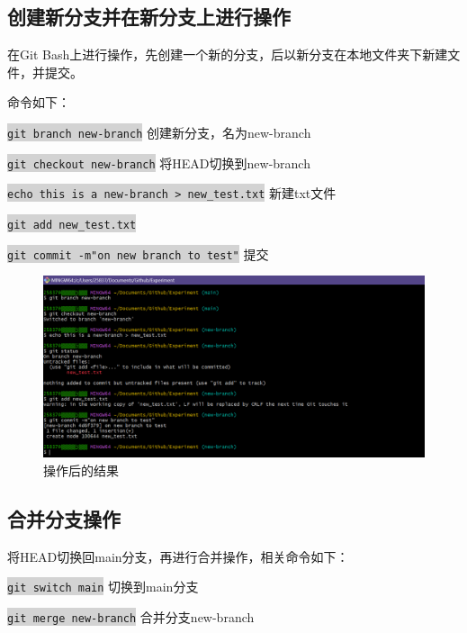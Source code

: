 \documentclass[a4paper, 12pt]{article}
\begin{document}
\clearpage  %

  \subsection{创建新分支并在新分支上进行操作}

在Git Bash上进行操作，先创建一个新的分支，后以新分支在本地文件夹下新建文件，并提交。

命令如下：

\colorbox{lightgray}{\texttt{git branch new-branch}} 创建新分支，名为new-branch

\colorbox{lightgray}{\texttt{git checkout new-branch}} 将HEAD切换到new-branch

\colorbox{lightgray}{\texttt{echo this is a new-branch \textgreater\ new\_test.txt}} 新建txt文件

\colorbox{lightgray}{\texttt{git add new\_test.txt}}

\colorbox{lightgray}{\texttt{git commit -m"on new branch to test"}} 提交

\begin{figure}[h]
  \centering
  \includegraphics[width=1\textwidth]{im8}
  \caption{操作后的结果}
  \label{image-myimage}
\end{figure}

\clearpage

  \subsection{合并分支操作}

将HEAD切换回main分支，再进行合并操作，相关命令如下：

\colorbox{lightgray}{\texttt{git switch main}} 切换到main分支

\colorbox{lightgray}{\texttt{git merge new-branch}} 合并分支new-branch
\end{document}
